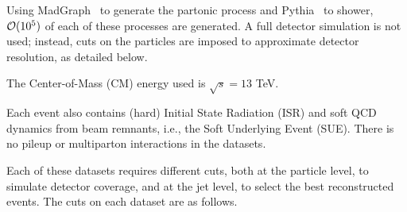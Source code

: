     Using MadGraph~\cite{alwall_madgraph2011} to generate the partonic process and Pythia~\cite{sjostrand_pythia2015} to shower, ${\cal O}(10^5)$ of each of these processes are generated.
    A full detector simulation is not used; instead, cuts on the particles are imposed to approximate detector resolution, as detailed below. 
    
    The Center-of-Mass (CM) energy used is \(\sqrt{s}=13 \) TeV.

    Each event also contains (hard) Initial State Radiation (ISR) and soft QCD dynamics from beam remnants, i.e., the Soft Underlying Event (SUE).
    There is no pileup or multiparton interactions in the datasets.

    Each of these datasets requires different cuts, both at the particle level, to simulate detector coverage, and at the jet level, to select the best reconstructed events.
    The cuts on each dataset are as follows.
